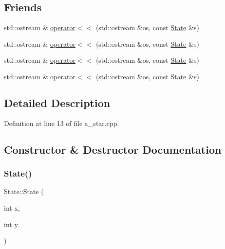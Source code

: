 \subsection*{Friends}
\begin{DoxyCompactItemize}
\item 
std\+::ostream \& \hyperlink{struct_state_a5604754e63c801276d20313c05a68847}{operator$<$$<$} (std\+::ostream \&os, const \hyperlink{struct_state}{State} \&s)
\item 
std\+::ostream \& \hyperlink{struct_state_a5604754e63c801276d20313c05a68847}{operator$<$$<$} (std\+::ostream \&os, const \hyperlink{struct_state}{State} \&s)
\item 
std\+::ostream \& \hyperlink{struct_state_a5604754e63c801276d20313c05a68847}{operator$<$$<$} (std\+::ostream \&os, const \hyperlink{struct_state}{State} \&s)
\item 
std\+::ostream \& \hyperlink{struct_state_a5604754e63c801276d20313c05a68847}{operator$<$$<$} (std\+::ostream \&os, const \hyperlink{struct_state}{State} \&s)
\end{DoxyCompactItemize}


\subsection{Detailed Description}


Definition at line 13 of file a\+\_\+star.\+cpp.



\subsection{Constructor \& Destructor Documentation}
\mbox{\label{struct_state_a200e450f63a590ee3a777b60684963ee}} 
\subsubsection{\texorpdfstring{State()}{State()}\hspace{0.1cm}{\footnotesize\ttfamily [1/8]}}
{\footnotesize\ttfamily State\+::\+State (\begin{DoxyParamCaption}\item[{int}]{x,  }\item[{int}]{y }\end{DoxyParamCaption})\hspace{0.3cm}{\ttfamily [inline]}}



